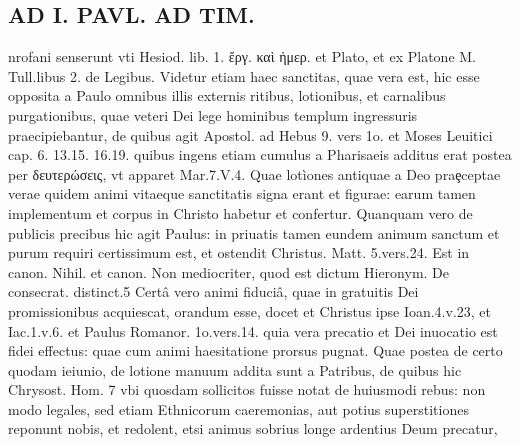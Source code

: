 \documentclass{article}
\begin{document}
\begin{pages}
\section*{AD I. PAVL. AD TIM. }
\marginpar{[ p.66 ]}\pstart nrofani senserunt vti Hesiod. lib. 1. ἔργ. καὶ ἠμερ. et Plato, et ex Platone M. Tull.libus 2. de Legibus. Videtur etiam haec sanctitas, quae vera est, hic esse opposita a Paulo omnibus illis externis ritibus, lotionibus, et carnalibus purgationibus, quae veteri Dei lege hominibus templum ingressuris praecipiebantur, de quibus agit Apostol. ad Hebus  9. vers 1o. et Moses Leuitici cap. 6. 13.15. 16.19. quibus ingens etiam cumulus a Pharisaeis additus erat postea per δευτερώσεις, vt apparet Mar.7.V.4. Quae lotìones antiquae a Deo praȩceptae verae quidem animi vitaeque sanctitatis signa erant et figurae: earum tamen implementum et corpus in Christo habetur et confertur. Quanquam vero de publicis precibus hic agit Paulus: in priuatis tamen eundem animum sanctum et purum requiri certissimum est, et ostendit Christus. Matt. 5.vers.24. Est in canon. Nihil. et canon. Non mediocriter, quod est dictum Hieronym. De consecrat. distinct.5 Certâ vero animi fiduciâ, quae in gratuitis Dei promissionibus acquiescat, orandum esse, docet et Christus ipse Ioan.4.v.23, et Iac.1.v.6. et Paulus Romanor. 1o.vers.14. quia vera precatio et Dei inuocatio est fidei effectus: quae cum animi haesitatione prorsus pugnat. Quae postea de certo quodam ieiunio, de lotione manuum addita sunt a Patribus, de quibus hic Chrysost. Hom. 7 vbi quosdam sollicitos fuisse notat de huiusmodi rebus: non modo legales, sed etiam Ethnicorum caeremonias, aut potius superstitiones reponunt nobis, et redolent, etsi animus sobrius longe ardentius Deum precatur,  \pend

\end{pages}
\end{document}
